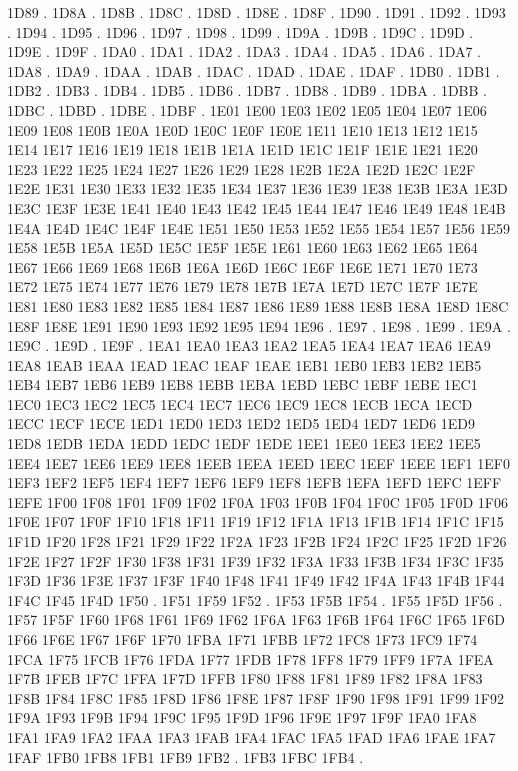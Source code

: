 1D89 .
1D8A .
1D8B .
1D8C .
1D8D .
1D8E .
1D8F .
1D90 .
1D91 .
1D92 .
1D93 .
1D94 .
1D95 .
1D96 .
1D97 .
1D98 .
1D99 .
1D9A .
1D9B .
1D9C .
1D9D .
1D9E .
1D9F .
1DA0 .
1DA1 .
1DA2 .
1DA3 .
1DA4 .
1DA5 .
1DA6 .
1DA7 .
1DA8 .
1DA9 .
1DAA .
1DAB .
1DAC .
1DAD .
1DAE .
1DAF .
1DB0 .
1DB1 .
1DB2 .
1DB3 .
1DB4 .
1DB5 .
1DB6 .
1DB7 .
1DB8 .
1DB9 .
1DBA .
1DBB .
1DBC .
1DBD .
1DBE .
1DBF .
1E01 1E00
1E03 1E02
1E05 1E04
1E07 1E06
1E09 1E08
1E0B 1E0A
1E0D 1E0C
1E0F 1E0E
1E11 1E10
1E13 1E12
1E15 1E14
1E17 1E16
1E19 1E18
1E1B 1E1A
1E1D 1E1C
1E1F 1E1E
1E21 1E20
1E23 1E22
1E25 1E24
1E27 1E26
1E29 1E28
1E2B 1E2A
1E2D 1E2C
1E2F 1E2E
1E31 1E30
1E33 1E32
1E35 1E34
1E37 1E36
1E39 1E38
1E3B 1E3A
1E3D 1E3C
1E3F 1E3E
1E41 1E40
1E43 1E42
1E45 1E44
1E47 1E46
1E49 1E48
1E4B 1E4A
1E4D 1E4C
1E4F 1E4E
1E51 1E50
1E53 1E52
1E55 1E54
1E57 1E56
1E59 1E58
1E5B 1E5A
1E5D 1E5C
1E5F 1E5E
1E61 1E60
1E63 1E62
1E65 1E64
1E67 1E66
1E69 1E68
1E6B 1E6A
1E6D 1E6C
1E6F 1E6E
1E71 1E70
1E73 1E72
1E75 1E74
1E77 1E76
1E79 1E78
1E7B 1E7A
1E7D 1E7C
1E7F 1E7E
1E81 1E80
1E83 1E82
1E85 1E84
1E87 1E86
1E89 1E88
1E8B 1E8A
1E8D 1E8C
1E8F 1E8E
1E91 1E90
1E93 1E92
1E95 1E94
1E96 .
1E97 .
1E98 .
1E99 .
1E9A .
1E9C .
1E9D .
1E9F .
1EA1 1EA0
1EA3 1EA2
1EA5 1EA4
1EA7 1EA6
1EA9 1EA8
1EAB 1EAA
1EAD 1EAC
1EAF 1EAE
1EB1 1EB0
1EB3 1EB2
1EB5 1EB4
1EB7 1EB6
1EB9 1EB8
1EBB 1EBA
1EBD 1EBC
1EBF 1EBE
1EC1 1EC0
1EC3 1EC2
1EC5 1EC4
1EC7 1EC6
1EC9 1EC8
1ECB 1ECA
1ECD 1ECC
1ECF 1ECE
1ED1 1ED0
1ED3 1ED2
1ED5 1ED4
1ED7 1ED6
1ED9 1ED8
1EDB 1EDA
1EDD 1EDC
1EDF 1EDE
1EE1 1EE0
1EE3 1EE2
1EE5 1EE4
1EE7 1EE6
1EE9 1EE8
1EEB 1EEA
1EED 1EEC
1EEF 1EEE
1EF1 1EF0
1EF3 1EF2
1EF5 1EF4
1EF7 1EF6
1EF9 1EF8
1EFB 1EFA
1EFD 1EFC
1EFF 1EFE
1F00 1F08
1F01 1F09
1F02 1F0A
1F03 1F0B
1F04 1F0C
1F05 1F0D
1F06 1F0E
1F07 1F0F
1F10 1F18
1F11 1F19
1F12 1F1A
1F13 1F1B
1F14 1F1C
1F15 1F1D
1F20 1F28
1F21 1F29
1F22 1F2A
1F23 1F2B
1F24 1F2C
1F25 1F2D
1F26 1F2E
1F27 1F2F
1F30 1F38
1F31 1F39
1F32 1F3A
1F33 1F3B
1F34 1F3C
1F35 1F3D
1F36 1F3E
1F37 1F3F
1F40 1F48
1F41 1F49
1F42 1F4A
1F43 1F4B
1F44 1F4C
1F45 1F4D
1F50 .
1F51 1F59
1F52 .
1F53 1F5B
1F54 .
1F55 1F5D
1F56 .
1F57 1F5F
1F60 1F68
1F61 1F69
1F62 1F6A
1F63 1F6B
1F64 1F6C
1F65 1F6D
1F66 1F6E
1F67 1F6F
1F70 1FBA
1F71 1FBB
1F72 1FC8
1F73 1FC9
1F74 1FCA
1F75 1FCB
1F76 1FDA
1F77 1FDB
1F78 1FF8
1F79 1FF9
1F7A 1FEA
1F7B 1FEB
1F7C 1FFA
1F7D 1FFB
1F80 1F88
1F81 1F89
1F82 1F8A
1F83 1F8B
1F84 1F8C
1F85 1F8D
1F86 1F8E
1F87 1F8F
1F90 1F98
1F91 1F99
1F92 1F9A
1F93 1F9B
1F94 1F9C
1F95 1F9D
1F96 1F9E
1F97 1F9F
1FA0 1FA8
1FA1 1FA9
1FA2 1FAA
1FA3 1FAB
1FA4 1FAC
1FA5 1FAD
1FA6 1FAE
1FA7 1FAF
1FB0 1FB8
1FB1 1FB9
1FB2 .
1FB3 1FBC
1FB4 .
